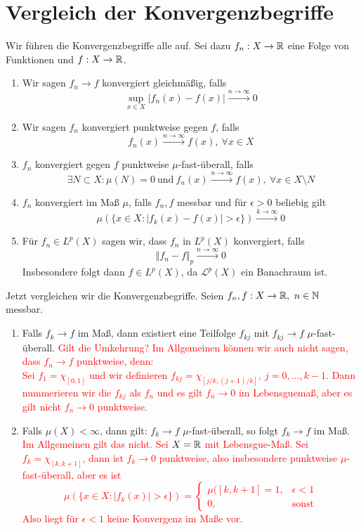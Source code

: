 \documentclass{scrartcl}
\begin{document}
    \section{Vergleich der Konvergenzbegriffe}
    \begin{defn} Wir führen die Konvergenzbegriffe alle auf. Sei dazu $f_n:X\to \mathbb{R}$ eine Folge von Funktionen und $f:X\to \mathbb{R}$.
        \begin{enumerate}
            \item Wir sagen $f_n \to f$ konvergiert gleichmäßig, falls
            \[
            \sup_{x\in X} \vert f_n(x)-f(x)\vert \xrightarrow{n\to \infty} 0    
            \] 
        \item Wir sagen $f_n$ konvergiert punktweise gegen $f$, falls 
        \[
        f_n(x) \xrightarrow{n\to \infty} f(x), \ \forall x\in X    
        \]
        \item $f_n$ konvergiert gegen $f$ punktweise $\mu$-fast-überall, falls 
        \[
        \exists N\subset X:  \mu(N)= 0 \ \text{und} \ f_n(x)\xrightarrow{n\to \infty} f(x), \ \forall x\in X\setminus N    
        \]
        \item $f_n$ konvergiert im Maß $\mu$, falls $f_n,f$ messbar und für $\epsilon>0$ beliebig gilt
        \[
        \mu(\{x\in X : \vert f_k(x)-f(x)\vert > \epsilon\}) \xrightarrow{k\to \infty} 0    
        \]
        \item Für $f_n\in L^p(X)$ sagen wir, dass $f_n$ in $L^p(X)$ konvergiert, falls
        \[
        \Vert f_n - f\Vert_p \xrightarrow{n\to \infty} 0    
        \]
        Insbesondere folgt dann $f\in L^p(X)$, da $\mathscr{L}^p(X)$ ein Banachraum ist.
        \end{enumerate}
    \end{defn}
    Jetzt vergleichen wir die Konvergenzbegriffe. Seien $f_n,f:X\to \mathbb{R}, \ n\in \mathbb{N}$ messbar. 
    \begin{enumerate}
        \item Falls $f_k \to f$ im Maß, dann existiert eine Teilfolge $f_{kj}$ mit $f_{kj}\to f$ $\mu$-fast-überall.
        \textcolor{red}{Gilt die Umkehrung? Im Allgemeinen können wir auch nicht sagen, dass $f_n\to f$ punktweise, denn:\\
        Sei $f_1=\chi_{[0,1]}$ und wir definieren $f_{kj} = \chi_{[j/k,(j+1)/k]}, \ j=0,\ldots,k-1$. Dann nummerieren wir die $f_{kj}$ als $f_n$ und es gilt $f_n\to 0$ im Lebensguemaß, aber es gilt nicht $f_n \to 0$ punktweise.}
        \item Falls \textbf{$\mu(X)<\infty$}, dann gilt: $f_k\to f$ $\mu$-fast-überall, so folgt $f_k\to f$ im Maß.
        \textcolor{red}{\\ Im Allgemeinen gilt das nicht. Sei $X=\mathbb{R}$ mit Lebensgue-Maß. Sei $f_k=\chi_{[k,k+1]}$, dann ist $f_k\to 0$ punktweise, also insbesondere punktweise $\mu$-fast-überall, aber es ist
        \[
        \mu(\{x\in X : \vert f_k(x)\vert > \epsilon\}) = \begin{cases} \mu([k,k+1]=1, & \epsilon<1\\
        0, & \text{sonst} \end{cases}    
        \] Also liegt für $\epsilon <1$ keine Konvergenz im Maße vor.}
    \end{enumerate}
\end{document}
